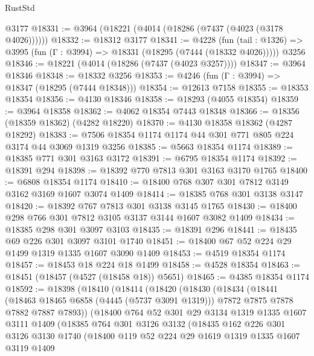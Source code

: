 \begin{lexlean}{RustStd}
\begin{coremodule}
{\begin{coremodule}
{{{{{{{{{{{{{{{{{{{{{{{{{{{{{{{{{{{{{{    @3177
@18331 := @3964 (@18221 (@4014 (@18286 (@7437 (@4023 (@3178 @4026))))))
@18332 := @18312 @3177
@18341 := @4228
    (fun (tail : @1326) => @3995 (fun (Γ : @3994) => @18331 (@18295 (@7444 (@18332 @4026)))))
    @3256
@18346 := @18221 (@4014 (@18286 (@7437 (@4023 @3257))))
@18347 := @3964 @18346
@18348 := @18332 @3256
@18353 := @4246 (fun (Γ : @3994) => @18347 (@18295 (@7444 @18348)))
@18354 := @12613 @7158
@18355 := @18353 @18354
@18356 := @4130 @18346
@18358 := @18293 (@4055 @18354)
@18359 := @3964 @18358
@18362 := @4062 @18354 @7443 @18348
@18366 := @18356 (@18359 @18362) (@4282 @18220)
@18370 := @4130 @18358 @18362 (@4287 @18292)
@18383 := @7506 @18354 @1174 @1174 @44 @301 @771 @805 @224 @3174 @44 @3069 @1319 @3256
@18385 := @5663 @18354 @1174
@18389 := @18385 @771 @301 @3163 @3172
@18391 := @6795 @18354 @1174
@18392 := @18391 @294
@18398 := @18392 @770 @7813 @301 @3163 @3170 @1765
@18400 := @6808 @18354 @1174
@18410 := @18400 @768 @307 @301 @7812 @3149 @3162 @3169 @1607 @3074 @1409
@18414 := @18385 @768 @301 @3138 @3147
@18420 := @18392 @767 @7813 @301 @3138 @3145 @1765
@18430 := @18400 @298 @766 @301 @7812 @3105 @3137 @3144 @1607 @3082 @1409
@18434 := @18385 @298 @301 @3097 @3103
@18435 := @18391 @296
@18441 := @18435 @69 @226 @301 @3097 @3101 @1740
@18451 := @18400 @67 @52 @224 @29 @1499 @1319 @1335 @1607 @3090 @1409
@18453 := @4519 @18354 @1174
@18457 := @18453 @18 @224 @18 @1499
@18458 := @4528 @18354
@18463 := @18451 (@18457 (@4527 (@18458 @18)) @5651)
@18465 := @4385 @18354 @1174
@18592 := @18398
    (@18410
      (@18414
        (@18420
          (@18430
            (@18434
              (@18441
                (@18463 @18465 @6858 (@4445 (@5737 @3091 @1319)))
                @7872
                @7875
                @7878
                @7882
                @7887
                @7893))
            (@18400
              @764
              @52
              @301
              @29
              @3134
              @1319
              @1335
              @1607
              @3111
              @1409
              (@18385
                @764
                @301
                @3126
                @3132
                (@18435
                  @162
                  @226
                  @301
                  @3126
                  @3130
                  @1740
                  (@18400
                    @119
                    @52
                    @224
                    @29
                    @1619
                    @1319
                    @1335
                    @1607
                    @3119
                    @1409
}}}}}}}}}}}}}}}}}}}}}}}}}}}}}}}}}}}}}}
\end{coremodule}}
\end{coremodule}
\end{lexlean}
